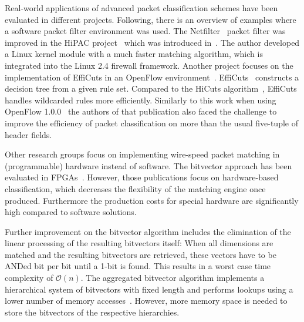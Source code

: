 \documentclass[conference]{IEEEtran}
\begin{document}
Real-world applications of advanced packet classification schemes have been evaluated in different projects.
Following, there is an overview of examples where a software packet filter environment was used.
The Netfilter~\cite{netfilter} packet filter was improved in the HiPAC project~\cite{hipac} 
which was introduced in~\cite{heinzhigh}.
The author developed a Linux kernel module with a much faster matching algorithm, 
which is integrated into the Linux 2.4 firewall framework.
Another project focuses on the implementation of EffiCuts in an OpenFlow environment~\cite{stimpfling2013optimal}.
EffiCuts~\cite{efficuts} constructs a decision tree from a given rule set.
Compared to the HiCuts algorithm~\cite{hicuts}, EffiCuts handles wildcarded rules more efficiently.
Similarly to this work when using OpenFlow 1.0.0~\cite{openflow_spec10} 
the authors of that publication also faced the challenge to improve the efficiency 
of packet classification on more than the usual five-tuple of header fields.

Other research groups focus on implementing wire-speed packet matching in (programmable) hardware instead of software.
The bitvector approach has been evaluated in FPGAs~\cite{bitvector_fpga, qu2013fast}.
However, those publications focus on hardware-based classification, which decreases 
the flexibility of the matching engine once produced.
Furthermore the production costs for special hardware are significantly high compared to software solutions.

Further improvement on the bitvector algorithm includes the elimination of the linear processing of the resulting bitvectors itself:
When all dimensions are matched and the resulting bitvectors are retrieved, 
these vectors have to be ANDed bit per bit until a 1-bit is found.
This results in a worst case time complexity of $\mathcal O(n)$.
The aggregated bitvector algorithm implements a hierarchical system 
of bitvectors with fixed length and performs lookups using a lower number of memory accesses~\cite{abv}.
However, more memory space is needed to store the bitvectors of the respective hierarchies.
\end{document}
